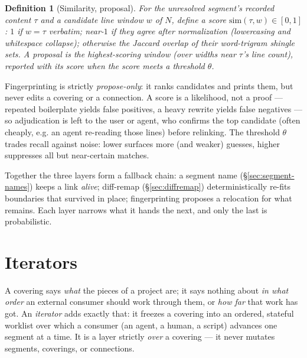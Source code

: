 \documentclass[11pt,a4paper]{article}
\newtheorem{definition}{Definition}[section]
\begin{document}
\begin{definition}[Similarity, proposal]\label{def:fingerprint}
For the unresolved segment's recorded content $\tau$ and a candidate line
window $w$ of $N$, define a score $\mathrm{sim}(\tau, w) \in [0,1]$:
$1$ if $w = \tau$ verbatim; near-$1$ if they agree after normalization
(lowercasing and whitespace collapse); otherwise the Jaccard overlap of
their word-trigram shingle sets. A \emph{proposal} is the
highest-scoring window (over widths near $\tau$'s line count), reported
with its score when the score meets a threshold $\theta$.
\end{definition}

Fingerprinting is strictly \emph{propose-only}: it ranks candidates and
prints them, but never edits a covering or a connection. A score is a
likelihood, not a proof — repeated boilerplate yields false positives,
a heavy rewrite yields false negatives — so adjudication is left to the
user or agent, who confirms the top candidate (often cheaply, e.g. an
agent re-reading those lines) before relinking. The threshold $\theta$
trades recall against noise: lower surfaces more (and weaker) guesses,
higher suppresses all but near-certain matches.

Together the three layers form a fallback chain: a segment name
(\S\ref{sec:segment-names}) keeps a link \emph{alive}; diff-remap
(\S\ref{sec:diffremap}) deterministically re-fits boundaries that
survived in place; fingerprinting proposes a relocation for what
remains. Each layer narrows what it hands the next, and only
the last is probabilistic.

\section{Iterators}\label{sec:iterators}

A covering says \emph{what} the pieces of a project are; it says nothing
about \emph{in what order} an external consumer should work through them,
or \emph{how far} that work has got. An \emph{iterator} adds exactly that:
it freezes a covering into an ordered, stateful worklist over which a
consumer (an agent, a human, a script) advances one segment at a time. It
is a layer strictly \emph{over} a covering --- it never mutates segments,
coverings, or connections.
\end{document}

